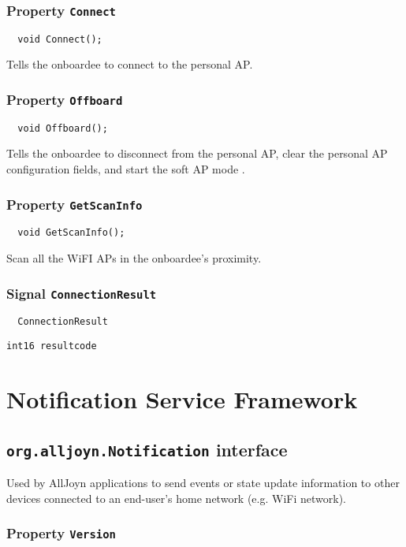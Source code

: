 \documentclass{note}
\begin{document}
\subsubsection{Property {\bf\texttt{Connect}}}
\begin{verbatim}
  void Connect();
\end{verbatim}
Tells the onboardee to connect to the personal AP.
\subsubsection{Property {\bf\texttt{Offboard}}}
\begin{verbatim}
  void Offboard();
\end{verbatim}
Tells the onboardee to disconnect from the
  personal AP, clear the personal AP configuration fields, and start the soft
  AP mode .
\subsubsection{Property {\bf\texttt{GetScanInfo}}}
\begin{verbatim}
  void GetScanInfo();
\end{verbatim}
Scan all the WiFI APs in the
  onboardee's proximity.

\subsubsection{Signal {\bf\texttt{ConnectionResult}}}
\begin{verbatim}
  ConnectionResult
\end{verbatim}
     \bit
     \w \verb+int16 resultcode+
     \eit


\section{Notification Service Framework}
\subsection{{\bf\texttt{org.alljoyn.Notification}} interface}
Used by AllJoyn applications to send events or state update information to
other devices connected to an end-user's home network (e.g. WiFi network).
\subsubsection{Property {\bf\texttt{Version}}}
\end{document}
